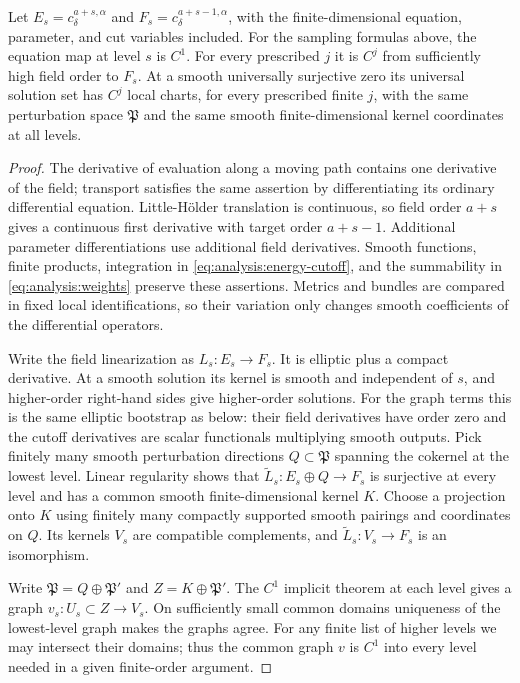 \begin{lemma}\label{lem:analysis:scale}
Let $E_s=c^{a+s,\alpha}_\delta$ and
$F_s=c^{a+s-1,\alpha}_\delta$, with the finite-dimensional equation,
parameter, and cut variables included.  For the sampling formulas above,
the equation map at level $s$ is $C^1$.  For every prescribed $j$ it is
$C^j$ from sufficiently high field order to $F_s$.  At a smooth
universally surjective zero its universal solution set has $C^j$ local
charts, for every prescribed finite $j$, with the same perturbation
space $\mathfrak P$ and the same smooth finite-dimensional kernel
coordinates at all levels.
\end{lemma}
\begin{proof}
The derivative of evaluation along a moving path contains one derivative
of the field; transport satisfies the same assertion by differentiating
its ordinary differential equation.  Little-H\"older translation is
continuous, so field order $a+s$ gives a continuous first derivative
with target order $a+s-1$.  Additional parameter differentiations use
additional field derivatives.  Smooth functions, finite products,
integration in \eqref{eq:analysis:energy-cutoff}, and the summability
in \eqref{eq:analysis:weights} preserve these assertions.  Metrics and
bundles are compared in fixed local identifications, so their variation
only changes smooth coefficients of the differential operators.

Write the field linearization as $L_s:E_s\to F_s$.  It is elliptic plus
a compact derivative.  At a smooth solution its kernel is smooth and
independent of $s$, and higher-order right-hand sides give higher-order
solutions.  For the graph terms this is the same elliptic bootstrap as
below: their field derivatives have order zero and the cutoff derivatives
are scalar functionals multiplying smooth outputs.  Pick finitely many
smooth perturbation directions $Q\subset\mathfrak P$ spanning the
cokernel at the lowest level.  Linear regularity shows that
$\widetilde L_s:E_s\oplus Q\to F_s$ is surjective at every level and
has a common smooth finite-dimensional kernel $K$.  Choose a projection
onto $K$ using finitely many compactly supported smooth pairings and
coordinates on $Q$.  Its kernels $V_s$ are compatible complements, and
$\widetilde L_s:V_s\to F_s$ is an isomorphism.

Write $\mathfrak P=Q\oplus\mathfrak P'$ and
$Z=K\oplus\mathfrak P'$.  The $C^1$ implicit theorem at each level
gives a graph $v_s:U_s\subset Z\to V_s$.  On sufficiently small
common domains uniqueness of the lowest-level graph makes the graphs
agree.  For any finite list of higher levels we may intersect their
domains; thus the common graph $v$ is $C^1$ into every level needed in
a given finite-order argument.


\end{proof}
